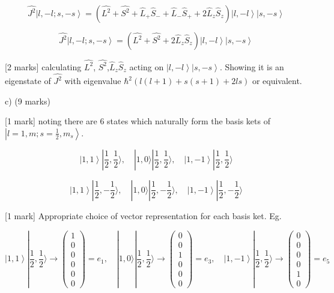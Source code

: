 \documentclass[a4paper,11pt]{article}
\begin{document}
\[ 
\hat{J^{2}}\left|l, -l; s, -s \right> = \left( \hat{L^{2}} + \hat{S^{2}} + \hat{L}_{+}\hat{S}_{-} +  \hat{L}_{-}\hat{S}_{+} + 2\hat{L}_{z}\hat{S}_{z} \right) \left|l, -l \right> \left|s, -s \right>  
\]

\[
\hat{J^{2}}\left|l, -l; s, -s \right> = \left( \hat{L^{2}} + \hat{S^{2}} + 2\hat{L}_{z}\hat{S}_{z} \right)  \left|l, -l \right> \left|s, -s \right>
\]

[2 marks] calculating \( \hat{L^{2}} \), \( \hat{S^{2}} \),\( \hat{L}_{z}\hat{S}_{z} \) acting on \( \left|l, -l \right> \left|s, -s \right> \). Showing it is an eigenstate of  \( \hat{J^{2}} \) with eigenvalue \( \hbar^2 \left ( l(l+1) + s(s+1) + 2ls \right ) \) or equivalent. 

c) (9 marks)

[1 mark] noting there are 6 states which naturally form the basis kets of \( \left|l=1, m; s=\frac{1}{2}, m_{s} \right> \).

\[ \left|1, 1 \right> |\frac{1}{2},\frac{1}{2} \rangle, \quad |1, 0 \rangle |\frac{1}{2}, \frac{1}{2} \rangle, \quad \left|1, -1 \right>|\frac{1}{2}, \frac{1}{2} \rangle \]

\[ \left|1, 1 \right> |\frac{1}{2},-\frac{1}{2} \rangle, \quad |1, 0 \rangle |\frac{1}{2}, -\frac{1}{2} \rangle, \quad \left|1, -1 \right>|\frac{1}{2}, -\frac{1}{2} \rangle \]

[1 mark] Appropriate choice of vector representation for each basis ket. Eg. 

\[
 \left|1, 1 \right> |\frac{1}{2},\frac{1}{2} \rangle \rightarrow \begin{pmatrix} 1\\ 0\\ 0\\ 0\\ 0\\ 0 \end{pmatrix} = e_1, \quad |1, 0 \rangle |\frac{1}{2}, \frac{1}{2} \rangle \rightarrow \begin{pmatrix} 0\\ 0\\ 1\\ 0\\ 0\\ 0 \end{pmatrix} = e_3, \quad \left|1, -1 \right>|\frac{1}{2}, \frac{1}{2} \rangle \rightarrow \begin{pmatrix} 0\\ 0\\ 0\\ 0\\ 1\\ 0 \end{pmatrix} = e_5
\]
\end{document}
